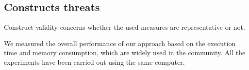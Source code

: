\subsection{Constructs threats}

Construct validity concerns whether the used measures are representative or not.

We measured the overall performance of our approach based on the execution time and memory consumption, which are widely used in the community. All the experiments have been carried out using the same computer.



